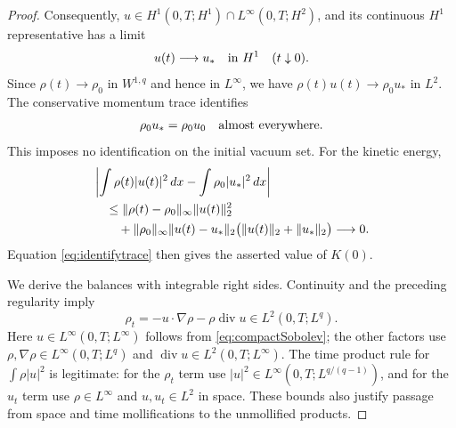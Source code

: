 \documentclass[11pt,letterpaper]{article}
\numberwithin{equation}{section}
\theoremstyle{definition}
\newcommand{\dd}{\,dx}
\newcommand{\Div}{\operatorname{div}}
\newcommand{\norm}[2]{\lVert#1\rVert_{#2}}
\begin{document}
\begin{proof}
Consequently,
$u\in H^1(0,T;H^1)\cap L^\infty(0,T;H^2)$, and its continuous
$H^1$ representative has a limit
\begin{equation}
 u(t)\longrightarrow u_*
       \quad\hbox{in }H^1\quad(t\downarrow0).
 \label{eq:velocitytrace}
\end{equation}
Since $\rho(t)\to\rho_0$ in $W^{1,q}$ and hence in $L^\infty$,
we have $\rho(t)u(t)\to\rho_0u_*$ in $L^2$.
The conservative momentum trace identifies
\begin{equation}
 \rho_0u_*=\rho_0u_0\quad\hbox{almost everywhere}.
 \label{eq:identifytrace}
\end{equation}
This imposes no identification on the initial vacuum set. For the
kinetic energy,
\begin{align}
 &\left|\int\rho(t)|u(t)|^2\dd-\int\rho_0|u_*|^2\dd\right|\notag\\
 &\quad\le
 \norm{\rho(t)-\rho_0}{\infty}\norm{u(t)}{2}^2\notag\\
 &\qquad
   +\norm{\rho_0}{\infty}\norm{u(t)-u_*}{2}
           \bigl(\norm{u(t)}{2}+\norm{u_*}{2}\bigr)
 \longrightarrow0.
 \label{eq:kinetictrace}
\end{align}
Equation \eqref{eq:identifytrace} then gives the asserted value of
$K(0)$.

We derive the balances with integrable right sides. Continuity and
the preceding regularity imply
\begin{equation}
 \rho_t=-u\cdot\nabla\rho-\rho\Div u
       \in L^2(0,T;L^q).
 \label{eq:densitytime}
\end{equation}
Here $u\in L^\infty(0,T;L^\infty)$ follows from
\eqref{eq:compactSobolev}; the other factors use
$\rho,\nabla\rho\in L^\infty(0,T;L^q)$ and
$\Div u\in L^2(0,T;L^\infty)$.
The time product rule for $\int\rho|u|^2$ is legitimate:
for the $\rho_t$ term use
$|u|^2\in L^\infty(0,T;L^{q/(q-1)})$, and for the $u_t$ term
use $\rho\in L^\infty$ and $u,u_t\in L^2$ in space.
These bounds also justify passage from space and time
mollifications to the unmollified products.


\end{proof}
\end{document}
